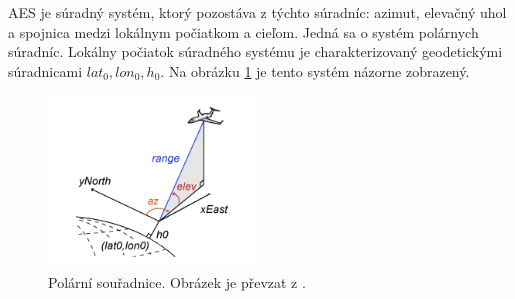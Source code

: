AES je súradný systém, ktorý pozostáva z týchto súradníc: azimut, elevačný uhol a spojnica medzi lokálnym počiatkom a cieľom. Jedná sa o systém polárnych súradníc. Lokálny počiatok súradného systému je charakterizovaný geodetickými súradnicami $lat_{0}, lon_{0}, h_{0}$. Na obrázku \ref{fig:aes} je tento systém názorne zobrazený.

\begin{figure}[ht!]
\begin{center}
\includegraphics[width=0.50\textwidth]{FIG/AES}
\caption{Polární souřadnice. Obrázek je převzat z \cite{aesMatlab}.}
\label{fig:aes}
\end{center}
\end{figure}

